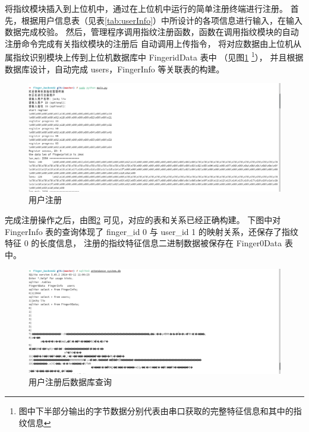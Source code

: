     将指纹模块插入到上位机中，通过在上位机中运行的简单注册终端进行注册。
    首先，根据用户信息表（见表\ref{tab:userInfo}）中所设计的各项信息进行输入，在输入数据完成校验。
    然后，管理程序调用指纹注册函数，函数在调用指纹模块的自动注册命令完成有关指纹模块的注册后
    自动调用上传指令，
    将对应数据由上位机从属指纹识别模块上传到上位机数据库中 Finger{id}Data 表中
    （见图\ref{test::用户注册} \footnote{图中下半部分输出的字节数据分别代表由串口获取的完整特征信息和其中的指纹信息}），
    并且根据数据库设计，自动完成 users，FingerInfo 等关联表的构建。

    \begin{figure}[ht]
        \centering
        \includegraphics[width=\textwidth]{./imgs/测试-用户注册.png}
        \caption{用户注册}    \label{test::用户注册} 
    \end{figure}   

    完成注册操作之后，由图\ref{test::注册后数据库查询} 可见，对应的表和关系已经正确构建。
    下图中对 FingerInfo 表的查询体现了 finger\_id 0 与 user\_id 1 的映射关系，还保存了指纹特征 0 的长度信息，
    注册的指纹特征信息二进制数据被保存在 Finger0Data 表中。

    \begin{figure}[ht]
        \centering
        \includegraphics[width=\textwidth]{./imgs/测试-注册后数据库查询.png}
        \caption{用户注册后数据库查询}    \label{test::注册后数据库查询}
    \end{figure}   

